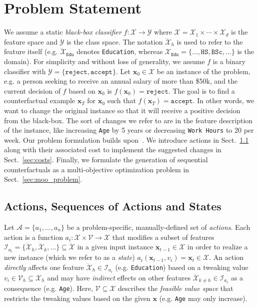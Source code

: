 \documentclass[runningheads, envcountsame, a4paper]{llncs}
\newcommand{\actions}{\mathcal{A}}
\newcommand{\action}{a}
\newcommand{\Values}{\mathcal{V}}
\newcommand{\Value}{v}
\newcommand{\state}{\mathbf{x}}
\newcommand{\initialinstance}{\state_{0}}
\newcommand{\originalclass}{\texttt{reject}}
\newcommand{\targetclass}{\texttt{accept}}
\newcommand{\featurespace}{\mathcal{X}}
\newcommand{\feature}{\dddot{\featurespace}}
\newcommand{\featureindex}{\mathcal{I}}
\newcommand{\predictionspace}{\mathcal{Y}}
\newcommand{\blackbox}{f}
\newcommand{\finalsolution}{\state_{T}}
\begin{document}
\section{Problem Statement}
\label{sec:problem}
We assume a static \emph{black-box classifier} $\blackbox: \featurespace \to \predictionspace$ where  $\featurespace = \featurespace_1 \times \cdots \times \featurespace_d$ is the feature space and $\predictionspace$ is the class space.
The notation $\feature_h$ is used to refer to the feature itself (e.g. $\feature_{\texttt{Edu}}$ denotes \texttt{Education}, whereas $\featurespace_{\texttt{Edu}} = \{\dots, \texttt{HS}, \texttt{BSc}, \dots\}$ is the domain).
For simplicity and without loss of generality, we assume $\blackbox$ is a binary classifier with $\predictionspace=\{\originalclass,\targetclass\}$. 
%
Let $\initialinstance \in \featurespace$ be an instance of the problem, e.g. a person seeking to receive an annual salary of more than \$50k, and the current decision of $\blackbox$ based on $\initialinstance$ is $\blackbox(\initialinstance) = \originalclass$. The goal is to find a counterfactual example $\finalsolution$ for $\initialinstance$ such that $\blackbox(\finalsolution) = \targetclass$. 
In other words, we want to change the original instance so that it will receive a positive decision from the black-box. The sort of changes we refer to are in the feature description of the instance, like increasing \texttt{Age} by 5 years or decreasing \texttt{Work Hours} to 20 per week. 
Our problem formulation builds upon~\cite{ramakrishnanSynthesizingActionSequences2020}. 
We introduce actions in Sect.~\ref{sec:actions} along with their associated cost to implement the suggested changes in Sect.~\ref{sec:costs}.
Finally, we formulate the generation of sequential counterfactuals as a multi-objective optimization problem in Sect.~\ref{sec:moo_problem}.


\subsection{Actions, Sequences of Actions and States}
\label{sec:actions}
Let $\actions = \{\action_1,\dots,\action_n\}$ be a problem-specific, manually-defined set of \emph{actions}.
Each action is a function $\action_i: \featurespace \times \Values \to \featurespace$ that modifies a subset of features $\featureindex_{\action_{i}} = \{ \feature_h, \feature_k, \dots \} \subseteq \feature$ in a given input instance $\state_{t-1} \in \featurespace$ in order to realize a new instance (which we refer to as a \emph{state}) $\action_i(\state_{t-1}, \Value_i) = \state_t \in \featurespace$.
%
An action \emph{directly} affects one feature $\feature_h \in \featureindex_{\action_{i}}$ (e.g. \texttt{Education}) based on a tweaking value $\Value_i \in \Values_h \subseteq \featurespace_h$ and may have \emph{indirect} effects on other features $\feature_{k \neq h} \in \featureindex_{\action_{i}}$ as a consequence (e.g. \texttt{Age}).
Here, $\Values \subseteq \featurespace$ describes the \emph{feasible value space} that restricts the tweaking values based on the given $\state$ (e.g. \texttt{Age} may only increase).
\end{document}
